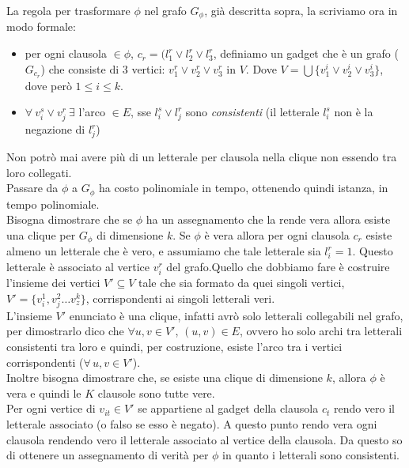 La regola per trasformare $\phi$ nel grafo $G_\phi$, già descritta sopra, la scriviamo ora in modo formale:
\begin{itemize}
    \item per ogni clausola $\displaystyle \in \phi$, $c_r = (l_1^r \lor l_2^r \lor l_3^r $, definiamo un gadget che è un grafo ($G_{c_r}$) che consiste di 3 vertici: $\displaystyle v_1^r \lor v_2^r \lor v_3^r$ in $V$. Dove $\displaystyle V = \bigcup \{v_1^i \lor v_2^i \lor v_3^i\}$, dove però $1 \leq i \leq k$.
    \item $\forall \  v_i^s \lor v_j^r \ \exists $ l'arco $\in E$, sse $l_i^s \lor l_j^r$ sono \textit{consistenti} (il letterale $l_i^s$ non è la negazione di $l_j^r$)
\end{itemize}
Non potrò mai avere più di un letterale per clausola nella clique non essendo tra loro collegati.\\ Passare da $\phi$ a $G_\phi$ ha costo polinomiale in tempo, ottenendo quindi istanza, in tempo polinomiale. \\

Bisogna dimostrare che se $\phi$ ha un assegnamento che la rende vera allora esiste una clique per $G_\phi$ di dimensione $k$. 
Se $\phi$ è vera allora per ogni clausola $c_r$ esiste almeno un letterale che è vero, e assumiamo che tale letterale sia $l_{i}^r = 1$. 
Questo letterale è associato al vertice $v_i^r$ del grafo.Quello che dobbiamo fare è costruire l'insieme dei vertici $V'\subseteq V$ tale che sia formato da quei singoli vertici, $V' = \{ v_i^1, v_j^2 \dots v_z^k\}$, corrispondenti ai singoli letterali veri.  \\ 
L'insieme $V'$ enunciato è una clique, infatti avrò solo letterali collegabili nel grafo, per dimostrarlo dico che $\forall u,v \in V'$, $(u,v) \in E$, ovvero ho solo archi tra letterali consistenti tra loro e quindi, per costruzione, esiste l'arco tra i vertici corrispondenti ($\forall\, u,v\in V'$).\\ 

Inoltre bisogna dimostrare che, se esiste una clique di dimensione $k$, allora $\phi$ è vera e quindi le $K$ clausole sono tutte vere. \\ Per ogni vertice di $v_{it}\in V'$ se appartiene al gadget della clausola $c_t$ rendo vero il letterale associato (o falso se esso è negato). A questo punto rendo vera ogni clausola rendendo vero il letterale associato al vertice della clausola. Da questo so di ottenere un assegnamento di verità per $\phi$ in quanto i letterali sono consistenti. 